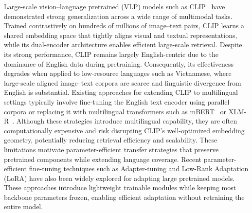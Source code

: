 Large-scale vision--language pretrained (VLP) models such as CLIP~\cite{radford2021learningtransferablevisualmodels} have demonstrated strong generalization across a wide range of multimodal tasks. Trained contrastively on hundreds of millions of image--text pairs, CLIP learns a shared embedding space that tightly aligns visual and textual representations, while its dual-encoder architecture enables efficient large-scale retrieval. Despite its strong performance, CLIP remains largely English-centric due to the dominance of English data during pretraining. Consequently, its effectiveness degrades when applied to low-resource languages such as Vietnamese, where large-scale aligned image--text corpora are scarce and linguistic divergence from English is substantial. Existing approaches for extending CLIP to multilingual settings typically involve fine-tuning the English text encoder using parallel corpora or replacing it with multilingual transformers such as mBERT~\cite{pires2019multilingualmultilingualbert} or XLM-R~\cite{conneau2020unsupervisedcrosslingualrepresentationlearning}. Although these strategies introduce multilingual capability, they are often computationally expensive and risk disrupting CLIP’s well-optimized embedding geometry, potentially reducing retrieval efficiency and scalability. These limitations motivate parameter-efficient transfer strategies that preserve pretrained components while extending language coverage. Recent parameter-efficient fine-tuning techniques such as Adapter-tuning and Low-Rank Adaptation (LoRA) \cite{hu2021loralowrankadaptationlarge} have also been widely explored for adapting large pretrained models. These approaches introduce lightweight trainable modules while keeping most backbone parameters frozen, enabling efficient adaptation without retraining the entire model.

